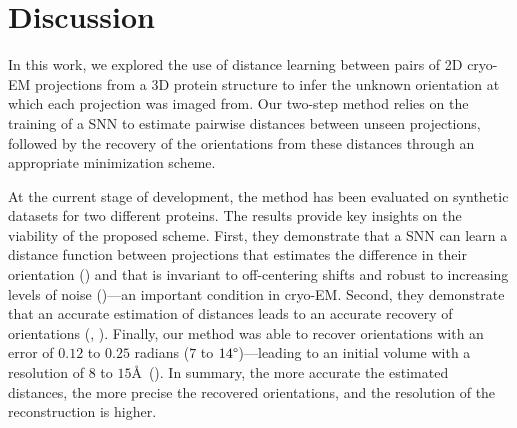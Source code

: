 \section{Discussion}\label{sec:discussion}

In this work, we explored the use of distance learning between pairs of 2D cryo-EM projections from a 3D protein structure to infer the unknown orientation at which each projection was imaged from.
Our two-step method relies on the training of a SNN to estimate pairwise distances between unseen projections, followed by the recovery of the orientations from these distances through an appropriate minimization scheme.


At the current stage of development, the method has been evaluated on synthetic datasets for two different proteins.
The results provide key insights on the viability of the proposed scheme.
First, they demonstrate that a SNN can learn a distance function between projections that estimates the difference in their orientation () and that is invariant to off-centering shifts and robust to increasing levels of noise ()---an important condition in cryo-EM\@.
Second, they demonstrate that an accurate estimation of distances leads to an accurate recovery of orientations (, ).
Finally, our method was able to recover orientations with an error of $0.12$ to $0.25$ radians ($7$ to $14\degree$)---leading to an initial volume
with a resolution of $8$ to $15$\AA\ ().
In summary, the more accurate the estimated distances, the more precise the recovered orientations, and the resolution of the reconstruction is higher.

